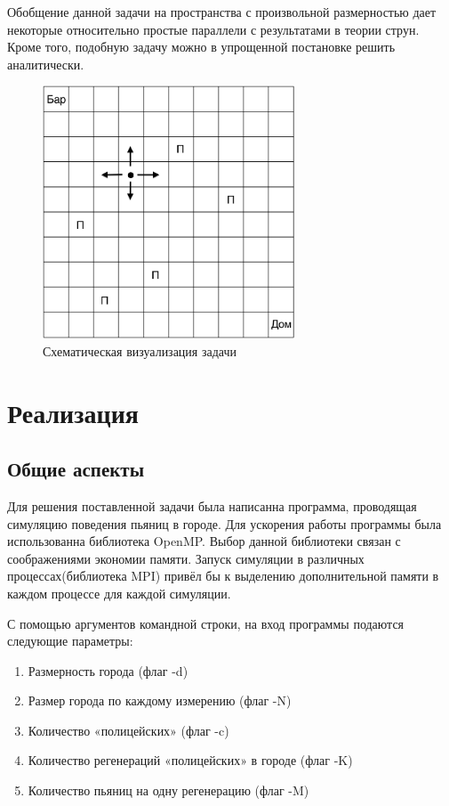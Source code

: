 \documentclass{article}
\begin{document}
        Обобщение данной задачи на пространства с произвольной размерностью дает некоторые относительно простые параллели с результатами в теории струн. Кроме того, подобную задачу можно в упрощенной постановке решить аналитически.

        \begin{figure}[ht]
            \centering
            \includegraphics[width=7.5cm]{pict.png}
            \caption{Схематическая визуализация задачи}
        \end{figure}
    \pagebreak


    \section{Реализация}
    \subsection{Общие аспекты}

    Для решения поставленной задачи была написанна программа, проводящая симуляцию поведения пьяниц в городе. Для ускорения работы программы была использованна библиотека OpenMP. Выбор данной библиотеки связан с соображениями экономии памяти. Запуск симуляции в различных процессах(библиотека MPI) привёл бы к выделению дополнительной памяти в каждом процессе для каждой симуляции.

    С помощью аргументов командной строки, на вход программы подаются следующие параметры:
    \begin{enumerate}[1.]
        \item Размерность города (флаг -d)
        \item Размер города по каждому измерению (флаг -N)
        \item Количество «полицейских» (флаг -c)
        \item Количество регенераций «полицейских» в городе (флаг -K)
        \item Количество пьяниц на одну регенерацию (флаг -M)
    \end{enumerate}
\end{document}
